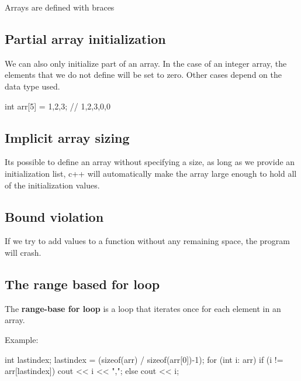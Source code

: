 \documentclass{report}
\begin{document}
    \bigbreak \noindent 
    \begin{notebox}
			Arrays are defined with braces
		\end{notebox}
    \bigbreak \noindent 

   \bigbreak \noindent 
   \subsection{Partial array initialization}
   \bigbreak \noindent 
   We can also only initialize part of an array. In the case of an integer array, the elements that we do not define will be set to zero. Other cases depend on the data type used.
   \bigbreak \noindent 
   
   \begin{cppcode}
int arr[5] = {1,2,3}; // {1,2,3,0,0}
   \end{cppcode}
   

   \bigbreak \noindent 
   \subsection{Implicit array sizing}
   \bigbreak \noindent 
   Its possible to define an array without specifying a size, as long as we provide an initialization list, c++ will automatically make the array large enough to hold all of the initialization values.

   \bigbreak \noindent 
   \subsection{Bound violation}
   \bigbreak \noindent 
   If we try to add values to a function without any remaining space, the program will crash.

   \pagebreak \bigbreak \noindent 
   \subsection{The range based for loop}
   \bigbreak \noindent 
   \begin{concept}
 The \textbf{range-base for loop} is a loop that iterates once for each element in an array.
	\end{concept}
   \bigbreak \noindent 
   Example:
   \bigbreak \noindent 
   
    \begin{cppcode}
int lastindex;
lastindex = (sizeof(arr) / sizeof(arr[0])-1);
for (int i: arr)  {
    if (i != arr[lastindex]) {
        cout << i << ",";
    } else {
        cout << i;
    }
}
   \end{cppcode}
   
\end{document}

